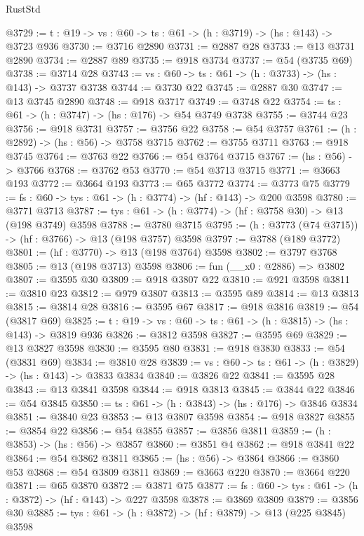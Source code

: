 \begin{lexlean}{RustStd}
\begin{coremodule}
@3729 := {t : @19} -> {vs : @60} -> {ts : @61} -> (h : @3719) -> (hs : @143) -> @3723 @936
@3730 := @3716 @2890
@3731 := @2887 @28
@3733 := @13 @3731 @2890
@3734 := @2887 @89
@3735 := @918 @3734
@3737 := @54 (@3735 @69)
@3738 := @3714 @28
@3743 := {vs : @60} -> {ts : @61} -> (h : @3733) -> (hs : @143) -> @3737 @3738
@3744 := @3730 @22
@3745 := @2887 @30
@3747 := @13 @3745 @2890
@3748 := @918 @3717
@3749 := @3748 @22
@3754 := {ts : @61} -> (h : @3747) -> (hs : @176) -> @54 @3749 @3738
@3755 := @3744 @23
@3756 := @918 @3731
@3757 := @3756 @22
@3758 := @54 @3757
@3761 := (h : @2892) -> (hs : @56) -> @3758 @3715
@3762 := @3755 @3711
@3763 := @918 @3745
@3764 := @3763 @22
@3766 := @54 @3764 @3715
@3767 := (hs : @56) -> @3766
@3768 := @3762 @53
@3770 := @54 @3713 @3715
@3771 := @3663 @193
@3772 := @3664 @193
@3773 := @65 @3772
@3774 := @3773 @75
@3779 := {fs : @60} -> {tys : @61} -> (h : @3774) -> (hf : @143) -> @200 @3598
@3780 := @3771 @3713
@3787 := {tys : @61} -> (h : @3774) -> (hf : @3758 @30) -> @13 (@198 @3749) @3598
@3788 := @3780 @3715
@3795 := (h : @3773 (@74 @3715)) -> (hf : @3766) -> @13 (@198 @3757) @3598
@3797 := @3788 (@189 @3772)
@3801 := (hf : @3770) -> @13 (@198 @3764) @3598
@3802 := @3797 @3768
@3805 := @13 (@198 @3713) @3598
@3806 := fun (__x0 : @2886) => @3802
@3807 := @3595 @30
@3809 := @918 @3807 @22
@3810 := @921 @3598
@3811 := @3810 @23
@3812 := @979 @3807
@3813 := @3595 @89
@3814 := @13 @3813
@3815 := @3814 @28
@3816 := @3595 @67
@3817 := @918 @3816
@3819 := @54 (@3817 @69)
@3825 := {t : @19} -> {vs : @60} -> {ts : @61} -> (h : @3815) -> (hs : @143) -> @3819 @936
@3826 := @3812 @3598
@3827 := @3595 @69
@3829 := @13 @3827 @3598
@3830 := @3595 @80
@3831 := @918 @3830
@3833 := @54 (@3831 @69)
@3834 := @3810 @28
@3839 := {vs : @60} -> {ts : @61} -> (h : @3829) -> (hs : @143) -> @3833 @3834
@3840 := @3826 @22
@3841 := @3595 @28
@3843 := @13 @3841 @3598
@3844 := @918 @3813
@3845 := @3844 @22
@3846 := @54 @3845
@3850 := {ts : @61} -> (h : @3843) -> (hs : @176) -> @3846 @3834
@3851 := @3840 @23
@3853 := @13 @3807 @3598
@3854 := @918 @3827
@3855 := @3854 @22
@3856 := @54 @3855
@3857 := @3856 @3811
@3859 := (h : @3853) -> (hs : @56) -> @3857
@3860 := @3851 @4
@3862 := @918 @3841 @22
@3864 := @54 @3862 @3811
@3865 := (hs : @56) -> @3864
@3866 := @3860 @53
@3868 := @54 @3809 @3811
@3869 := @3663 @220
@3870 := @3664 @220
@3871 := @65 @3870
@3872 := @3871 @75
@3877 := {fs : @60} -> {tys : @61} -> (h : @3872) -> (hf : @143) -> @227 @3598
@3878 := @3869 @3809
@3879 := @3856 @30
@3885 := {tys : @61} -> (h : @3872) -> (hf : @3879) -> @13 (@225 @3845) @3598

\end{coremodule}
\end{lexlean}
